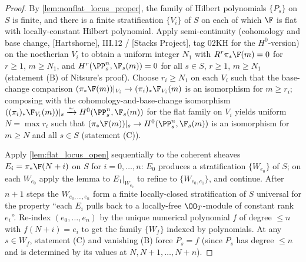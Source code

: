 \begin{proof}
  
  By \cref{lem:nonflat_locus_proper}, the family of Hilbert polynomials
  \(\{P_s\}\) on \(S\) is finite, and there is a finite stratification
  \(\{V_i\}\) of \(S\) on each of which \(\F\) is flat with locally-constant
  Hilbert polynomial.  Apply semi-continuity (cohomology and base change,
  [Hartshorne], III.12 / [Stacks Project], tag 02KH for the \(H^0\)-version) on
  the noetherian \(V_i\) to obtain a uniform integer \(N_1\) with
  \(R^r \pi_* \F(m) = 0\) for \(r \ge 1\), \(m \ge N_1\), and \(H^r(\PP^n_s, \F_s(m)) = 0\)
  for all \(s \in S\), \(r \ge 1\), \(m \ge N_1\) (statement (B) of Nitsure's proof).
  Choose \(r_i \ge N_1\) on each \(V_i\) such that the base-change comparison
  \((\pi_* \F(m))|_{V_i} \to (\pi_i)_* \F_{V_i}(m)\) is an isomorphism for
  \(m \ge r_i\); composing with the cohomology-and-base-change isomorphism
  \(((\pi_i)_* \F_{V_i}(m))|_s \xrightarrow{\sim} H^0(\PP^n_s, \F_s(m))\) for
  the flat family on \(V_i\) yields uniform \(N = \max r_i\) such that
  \((\pi_* \F(m))|_s \to H^0(\PP^n_s, \F_s(m))\) is an isomorphism for \(m \ge N\)
  and all \(s \in S\) (statement (C)).

  Apply \cref{lem:flat_locus_open} sequentially to the coherent sheaves
  \(E_i = \pi_* \F(N+i)\) on \(S\) for \(i = 0, \dots, n\): \(E_0\) produces a
  stratification \(\{W_{e_0}\}\) of \(S\); on each \(W_{e_0}\) apply the lemma to
  \(E_1|_{W_{e_0}}\) to refine to \(\{W_{e_0, e_1}\}\), and continue. After \(n+1\)
  steps the \(W_{e_0, \dots, e_n}\) form a finite locally-closed stratification
  of \(S\) universal for the property ``each \(E_i\) pulls back to a locally-free
  \(\OO_T\)-module of constant rank \(e_i\)''.  Re-index \((e_0, \dots, e_n)\) by the
  unique numerical polynomial \(f\) of degree \(\le n\) with \(f(N+i) = e_i\) to get
  the family \(\{W_f\}\) indexed by polynomials.  At any \(s \in W_f\), statement
  (C) and vanishing (B) force \(P_s = f\) (since \(P_s\) has degree \(\le n\) and is
  determined by its values at \(N, N+1, \dots, N+n\)).


\end{proof}
